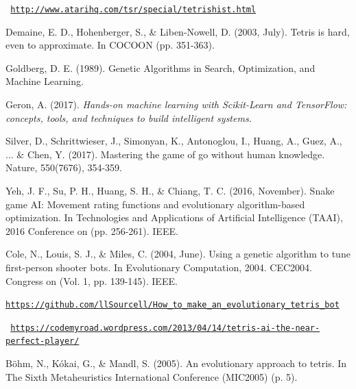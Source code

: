 \documentclass[conference]{IEEEtran}
\begin{document}
\begin{thebibliography}{00}

 \texttt{ \url{http://www.atarihq.com/tsr/special/tetrishist.html}}

 Demaine, E. D., Hohenberger, S., \& Liben-Nowell, D. (2003, July). Tetris is hard, even to approximate. In COCOON (pp. 351-363).

 Goldberg, D. E. (1989). Genetic Algorithms in Search, Optimization, and Machine Learning.

  Geron, A. (2017). \textit{Hands-on machine learning with Scikit-Learn and TensorFlow: concepts, tools, and techniques to build intelligent systems.}

 Silver, D., Schrittwieser, J., Simonyan, K., Antonoglou, I., Huang, A., Guez, A., ... \& Chen, Y. (2017). Mastering the game of go without human knowledge. Nature, 550(7676), 354-359.

 Yeh, J. F., Su, P. H., Huang, S. H., \& Chiang, T. C. (2016, November). Snake game AI: Movement rating functions and evolutionary algorithm-based optimization. In Technologies and Applications of Artificial Intelligence (TAAI), 2016 Conference on (pp. 256-261). IEEE.

 Cole, N., Louis, S. J., \& Miles, C. (2004, June). Using a genetic algorithm to tune first-person shooter bots. In Evolutionary Computation, 2004. CEC2004. Congress on (Vol. 1, pp. 139-145). IEEE.

 \texttt{\url{https://github.com/llSourcell/How_to_make_an_evolutionary_tetris_bot}}

 \texttt{ \url{https://codemyroad.wordpress.com/2013/04/14/tetris-ai-the-near-perfect-player/}}

 Böhm, N., Kókai, G., \& Mandl, S. (2005). An evolutionary approach to tetris. In The Sixth Metaheuristics International Conference (MIC2005) (p. 5).

\end{thebibliography}
\end{document}
